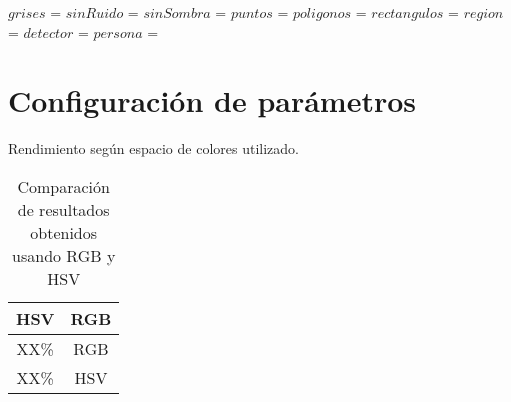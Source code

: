 \documentclass[../memoria.tex]{subfiles}
\begin{document}
\begin{algorithm}[h]
\DontPrintSemicolon
{}
\nl $grises$ = \;
\nl $sinRuido$ = \;
\nl $sinSombra$ = \;
\nl $puntos$ = \;
\nl $poligonos$ = \;
\nl $rectangulos$ = \;
\nl $region$ = \;
\nl $detector$ =  \siftCreate{}\;
\nl {}
\nl {}
\nl $persona$ = 
\caption{\texttt detectarPersona()} \label{detectar persona}
\end{algorithm}

\begin{algorithm}[h]
\DontPrintSemicolon
{}
\caption{reidentificar} \label{reidentificar}
\end{algorithm}

\section{Configuración de parámetros}

Rendimiento según espacio de colores utilizado.
\begin{table}
	\begin{center}
		\begin{tabular}{cc}
			HSV  & RGB  \\
			\hline
			XX\% & RGB \\
			XX\% & HSV \\
		\end{tabular}  
	\end{center}
	\caption{Comparación de resultados obtenidos usando RGB y HSV }
\label{experimentos RGB y HSV}
\end{table}
\end{document}
